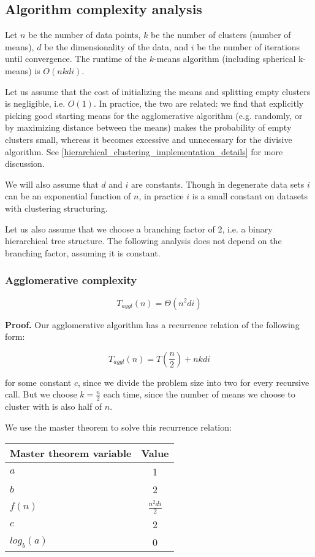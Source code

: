 \documentclass[../tech_report_1.tex]{subfiles}
\begin{document}
\subsection{Algorithm complexity analysis}

Let $n$ be the number of data points, $k$ be the number of clusters (number of means), $d$ be the dimensionality of the data, and $i$ be the number of iterations until convergence. The runtime of the $k$-means algorithm (including spherical k-means) is $O(nkdi)$.

Let us assume that the cost of initializing the means and splitting empty clusters is negligible, i.e. $O(1)$. In practice, the two are related: we find that explicitly picking good starting means for the agglomerative algorithm (e.g. randomly, or by maximizing distance between the means) makes the probability of empty clusters small, whereas it becomes excessive and unnecessary for the divisive algorithm. See \ref{hierarchical_clustering_implementation_details} for more discussion.

We will also assume that $d$ and $i$ are constants. Though in degenerate data sets $i$ can be an exponential function of $n$, in practice $i$ is a small constant on datasets with clustering structuring.

Let us also assume that we choose a branching factor of 2, i.e. a binary hierarchical tree structure. The following analysis does not depend on the branching factor, assuming it is constant.

\subsubsection{Agglomerative complexity}

\begin{theorem} $$T_{aggl}(n) = \Theta(n^2di)$$ \end{theorem}

\textbf{Proof.} Our agglomerative algorithm has a recurrence relation of the following form:

$$ T_{aggl}(n) = T(\frac{n}{2}) + nkdi $$

for some constant $c$, since we divide the problem size into two for every recursive call. But we choose $k=\frac{n}{2}$ each time, since the number of means we choose to cluster with is also half of $n$.

We use the master theorem  \cite{thomas2001introduction} to solve this recurrence relation:

\begin{table}[ht]
\centering
\begin{tabular}{l || c }
\hline
\textbf{Master theorem variable} & \textbf{Value} \\
\hline
$a$ & 1 \\
$b$ & 2 \\
$f(n)$ & $\frac{n^2di}{2}$ \\
$c$ & 2 \\
$log_b(a)$ & 0 \\
\hline
\end{tabular}
\end{table}
\end{document}
